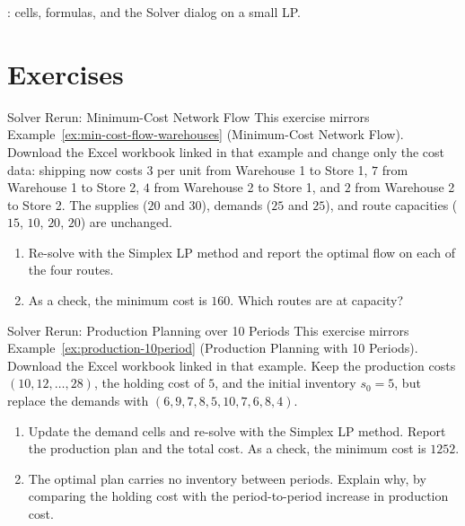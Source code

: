 \begin{tryit}
: cells, formulas, and the Solver dialog on a small LP.
\end{tryit}


\section{Exercises}


\begin{ex}{Solver Rerun: Minimum-Cost Network Flow}{}
\label{ex:excel-network-flow-rerun}
 This exercise mirrors Example~\ref{ex:min-cost-flow-warehouses} (Minimum-Cost Network Flow).  Download the Excel workbook linked in that example and change only the cost data: shipping now costs $3$ per unit from Warehouse 1 to Store 1, $7$ from Warehouse 1 to Store 2, $4$ from Warehouse 2 to Store 1, and $2$ from Warehouse 2 to Store 2.  The supplies ($20$ and $30$), demands ($25$ and $25$), and route capacities ($15$, $10$, $20$, $20$) are unchanged.
\begin{enumerate}
\item Re-solve with the Simplex LP method and report the optimal flow on each of the four routes.
\item As a check, the minimum cost is $160$.  Which routes are at capacity?
\end{enumerate}
\end{ex}

\begin{ex}{Solver Rerun: Production Planning over 10 Periods}{}
\label{ex:excel-production-rerun}
 This exercise mirrors Example~\ref{ex:production-10period} (Production Planning with 10 Periods).  Download the Excel workbook linked in that example.  Keep the production costs $(10, 12, \dots, 28)$, the holding cost of $5$, and the initial inventory $s_0 = 5$, but replace the demands with $(6, 9, 7, 8, 5, 10, 7, 6, 8, 4)$.
\begin{enumerate}
\item Update the demand cells and re-solve with the Simplex LP method.  Report the production plan and the total cost.  As a check, the minimum cost is $1252$.
\item The optimal plan carries no inventory between periods.  Explain why, by comparing the holding cost with the period-to-period increase in production cost.
\end{enumerate}
\end{ex}

